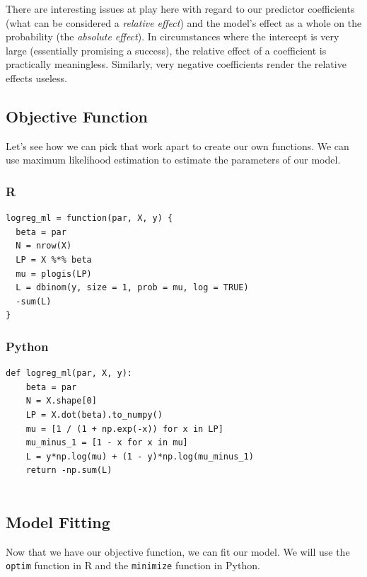 \documentclass[
  letterpaper,
]{krantz}
\begin{document}
There are interesting issues at play here with regard to our predictor
coefficients (what can be considered a \emph{relative effect}) and the
model's effect as a whole on the probability (the \emph{absolute
effect}). In circumstances where the intercept is very large
(essentially promising a success), the relative effect of a coefficient
is practically meaningless. Similarly, very negative coefficients render
the relative effects useless.

\subsection{Objective Function}\label{sec-glm-binomial-objective}

Let's see how we can pick that work apart to create our own functions.
We can use maximum likelihood estimation to estimate the parameters of
our model.

\subsubsection{R}

\begin{verbatim}
logreg_ml = function(par, X, y) {
  beta = par
  N = nrow(X)
  LP = X %*% beta                           
  mu = plogis(LP)                           
  L = dbinom(y, size = 1, prob = mu, log = TRUE)   
  -sum(L)                                   
}
\end{verbatim}

\subsubsection{Python}

\begin{verbatim}
def logreg_ml(par, X, y):
    beta = par
    N = X.shape[0]
    LP = X.dot(beta).to_numpy()  
    mu = [1 / (1 + np.exp(-x)) for x in LP]
    mu_minus_1 = [1 - x for x in mu]
    L = y*np.log(mu) + (1 - y)*np.log(mu_minus_1)   
    return -np.sum(L)   
  
\end{verbatim}

\subsection{Model Fitting}\label{sec-glm-binomial-fitting}

Now that we have our objective function, we can fit our model. We will
use the \texttt{optim} function in R and the \texttt{minimize} function
in Python.
\end{document}
